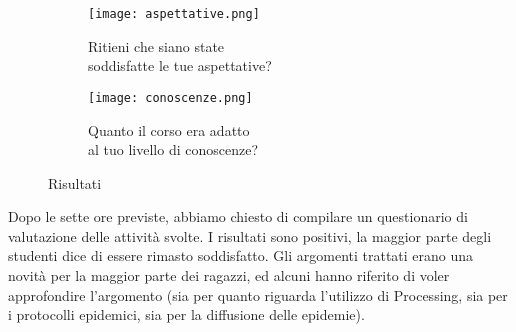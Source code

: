 \begin{figure}[h]
    
    \begin{subfigure}{.5\textwidth}
        \centering
        \texttt{[image: aspettative.png]}
        \captionsetup{justification=centering}
        \caption{Ritieni che siano state \\ soddisfatte le tue aspettative?} 
    \end{subfigure}
    \begin{subfigure}{.5\textwidth}
        \centering
        \texttt{[image: conoscenze.png]}
        \captionsetup{justification=centering}
        \caption{Quanto il corso era adatto  \\ al tuo livello di conoscenze?} 
    \end{subfigure}
    \caption{Risultati}
\end{figure} 

Dopo le sette ore previste, abbiamo chiesto di compilare un questionario di valutazione delle attività svolte. I risultati sono positivi, la maggior parte degli studenti dice di essere rimasto soddisfatto. Gli argomenti trattati erano una novità per la maggior parte dei ragazzi, ed alcuni hanno riferito di voler approfondire l'argomento (sia per quanto riguarda l'utilizzo di Processing, sia per i protocolli epidemici, sia per la diffusione delle epidemie). 